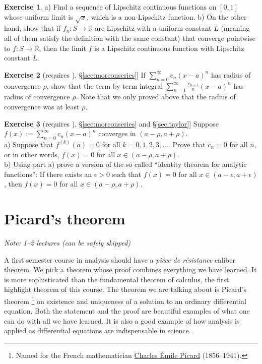 \documentclass[12pt]{book}
\newcommand{\R}{{\mathbb{R}}}
\newcommand{\sectionnotes}[1]{\noindent \emph{Note: #1} \medskip \par}
\newcommand{\sectionnewpage}{\clearpage}
\theoremstyle{plain}
\theoremstyle{remark}
\theoremstyle{definition}
\theoremstyle{exercise}
\newtheorem{exercise}{Exercise}[section]
\theoremstyle{example}
\newcommand{\sectionref}[1]{\hyperref[#1]{\S\ref*{#1}}}
\begin{document}
\begin{exercise}
a) Find a sequence of Lipschitz continuous functions on $[0,1]$
whose uniform limit is $\sqrt{x}$, which is a non-Lipschitz function.
b) On the other hand, show that if $f_n \colon S \to \R$ are Lipschitz
with a uniform constant $L$ (meaning all of them satisfy the definition
with the same constant) that converge pointwise to $f \colon S \to \R$,
then the limit $f$ is a Lipschitz continuous function
with Lipschitz constant $L$.
\end{exercise}

\begin{exercise}[requires \sectionref{sec:moreonseries}]
If $\sum_{n=0}^\infty c_n {(x-a)}^n$ has radius of convergence $\rho$,
show that the term by term integral
$\sum_{n=1}^\infty \frac{c_{n-1}}{n} {(x-a)}^n$ has radius of convergence
$\rho$.  Note that we only proved above that the radius of convergence was
at least $\rho$.
\end{exercise}

\begin{exercise}[requires \sectionref{sec:moreonseries} and \sectionref{sec:taylor}]
Suppose $f(x) := \sum_{n=0}^\infty c_n {(x-a)}^n$ converges in $(a-\rho,a+\rho)$.
\\
a)
Suppose that $f^{(k)}(a) = 0$ for all $k=0,1,2,3,\ldots$.  Prove that
$c_n = 0$ for all $n$, or in other words, 
$f(x) = 0$ for all $x \in (a-\rho,a+\rho)$.
\\
b) Using part a) prove a version of the so called ``identity
theorem for analytic functions'':  If there exists an $\epsilon > 0$
such that $f(x) = 0$ for all $x \in (a-\epsilon, a+\epsilon)$, then
$f(x) = 0$ for all $x \in (a-\rho,a+\rho)$.
\end{exercise}


\sectionnewpage
\section{Picard's theorem}
\label{sec:picard}

\sectionnotes{1--2 lectures (can be safely skipped)}

A first semester course in analysis should have
a \emph{pi\`ece de r\'esistance} caliber
theorem.  We pick a theorem whose proof combines everything we have
learned.  It is more sophisticated than the fundamental theorem of calculus,
the first highlight theorem of this course.  The
theorem we are talking about is Picard's
theorem%
\footnote{Named for the French mathematician
\href{http://en.wikipedia.org/wiki/\%C3\%89mile_Picard}{Charles \'Emile Picard}
(1856--1941).}
on existence and uniqueness of a solution to an ordinary differential equation.
Both the statement and the proof are beautiful examples of what one can do
with all we have learned.  It is also a good example of how analysis is
applied as differential equations are indispensable in science.
\end{document}
